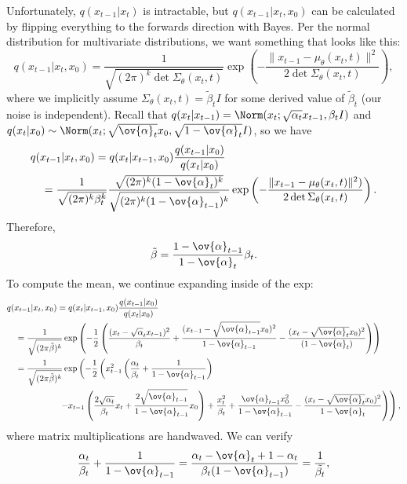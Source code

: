 Unfortunately, $q(x_{t-1}|x_t)$ is intractable, but $q(x_{t-1}|x_t,x_0)$ can be calculated by flipping everything to the forwards direction with Bayes. Per the normal distribution for multivariate distributions, we want something that looks like this: 
\[q(x_{t-1}|x_t,x_0) = \frac{1}{\sqrt{(2\pi)^k \det \Sigma_{\theta}(x_t,t)}}\exp\left(-\frac{\lVert x_{t-1} - \mu_{\theta}(x_t,t) \rVert^2}{2\det \Sigma_{\theta}(x_t,t)}\right),\] 
where we implicitly assume $\Sigma_{\theta}(x_t,t) = \tilde{\beta}_tI$ for some derived value of $\tilde{\beta}_t$ (our noise is independent). Recall that $q(x_t|x_{t-1}) = \Norm(x_t; \sqrt{\alpha_t}x_{t-1}, \beta_t I)$ and $q(x_{t}|x_{0})\sim \Norm(x_t; \sqrt{\ov{\alpha}_t}x_0, \sqrt{1-\ov{\alpha}_t}I)$, so we have 
\begin{align*}
	&q(x_{t-1}|x_t,x_0) = q(x_t|x_{t-1},x_0)\frac{q(x_{t-1}|x_0)}{q(x_t|x_0)}\\
	&\quad= \frac{1}{\sqrt{(2\pi)^k\beta_t^k}}\frac{\sqrt{(2\pi)^k(1-\ov{\alpha}_t)^k}}{\sqrt{(2\pi)^k(1-\ov{\alpha}_{t-1}})^k}\exp\left(-\frac{\lVert x_{t-1} - \mu_{\theta}(x_t,t)\rVert^2)}{2\det \Sigma_{\theta}(x_t,t)}\right).
\end{align*}
Therefore,
\[\tilde{\beta} = \frac{1-\ov{\alpha}_{t-1}}{1-\ov{\alpha}_t}\beta_t.\]
To compute the mean, we continue expanding inside of the exp: 
\begin{align*}
	&q(x_{t-1}|x_t,x_0) = q(x_t|x_{t-1},x_0)\frac{q(x_{t-1}|x_0)}{q(x_t|x_0)} \\
	&\quad = \frac{1}{\sqrt{(2\pi\tilde{\beta})^k}}\exp\left(-\frac{1}{2}\left(\frac{(x_t - \sqrt{\alpha}_tx_{t-1})^2}{\beta_t} + \frac{(x_{t-1} - \sqrt{\ov{\alpha}_{t-1}}x_0)^2}{1-\ov{\alpha}_{t-1}} - \frac{(x_t-\sqrt{\ov{\alpha}_t}x_0)^2}{(1-\ov{\alpha}_t)}\right)\right) \\
	&\quad= \frac{1}{\sqrt{(2\pi\tilde{\beta})^k}}\exp\left(-\frac{1}{2}\left(x_{t-1}^2\left(\frac{\alpha_t}{\beta_t} + \frac{1}{1-\ov{\alpha}_{t-1}}\right)\right.\right. \\
	&\qquad\qquad\qquad \left.\left. -x_{t-1}\left(\frac{2\sqrt{\alpha_t}}{\beta_t}x_t + \frac{2\sqrt{\ov{\alpha}_{t-1}}}{1-\ov{\alpha}_{t-1}}x_0\right) + \frac{x_t^2}{\beta_t} + \frac{\ov{\alpha}_{t-1}x_0^2}{1-\ov{\alpha}_{t-1}} - \frac{(x_t-\sqrt{\ov{\alpha}_t}x_0)^2}{1-\ov{\alpha}_t}\right)\right),
\end{align*}
where matrix multiplications are handwaved. We can verify 
\[\frac{\alpha_t}{\beta_t} + \frac{1}{1-\ov{\alpha}_{t-1}} = \frac{\alpha_t-\ov{\alpha}_t + 1-\alpha_t}{\beta_t(1-\ov{\alpha}_{t-1})} = \frac{1}{\tilde{\beta_t}},\]
